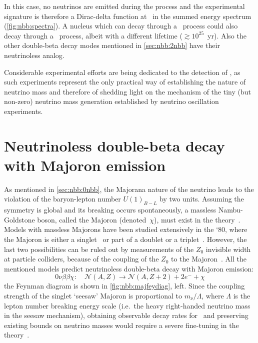 In this case, no neutrinos are emitted during
the process and the experimental signature is therefore a Dirac-delta function at \qbb\
in the summed energy spectrum (\cref{fig:nbb:spectra}).  A nucleus which can
decay through a \nnbb\ process could also decay through a \onbb\ process, albeit
with a different lifetime ($\gtrsim{10^{25}}$~yr). Also the other double-beta
decay modes mentioned in \cref{sec:nbb:2nbb} have their neutrinoless analog.

Considerable experimental efforts are being dedicated to the detection of
\onbb, as such experiments represent the only practical way of establishing
the nature of neutrino mass and therefore of shedding light on the mechanism of
the tiny (but non-zero) neutrino mass generation established by neutrino
oscillation experiments.

\section{Neutrinoless double-beta decay with Majoron emission}

As mentioned in \cref{sec:nbb:0nbb}, the Majorana nature of the neutrino leads
to the violation of the baryon-lepton number $U(1)_{B-L}$ by two units.
Assuming the symmetry is global and its breaking occurs spontaneously, a
massless Nambu-Goldstone boson, called the Majoron (denoted~$\chi$), must exist
in the theory~\cite{Chikashige1981, Schechter1982, Gelmini1981, Georgi1981,
Mohpatra2004}.  Models with massless Majorons have been studied extensively in
the `80, where the Majoron is either a singlet~\cite{Chikashige1981} or part of
a doublet or a triplet~\cite{Gelmini1981, Georgi1981}. However, the last two
possibilities can be ruled out by measurements of the $Z_0$ invisible width at
particle colliders, because of the coupling of the $Z_0$ to the
Majoron~\cite{Berezhiani1992}. All the mentioned models predict neutrinoless
double-beta decay with Majoron emission:
\[
  0\nu\beta\beta\chi:\quad
    \mathcal{N}(A,Z) \longrightarrow \mathcal{N}(A,Z+2) + 2e^- + \chi
\]
the Feynman diagram is shown in \cref{fig:nbb:majfeydiag}, left. Since the
coupling strength of the singlet `seesaw' Majoron is proportional to $m_\nu /
\Lambda$, where $\Lambda$ is the lepton number breaking energy scale (i.e.~the
heavy right-handed neutrino mass in the seesaw mechanism), obtaining observable
decay rates for \onbbx\ and preserving existing bounds on neutrino masses would
require a severe fine-tuning in the theory~\cite{Burgess1993, Burgess1994}.

